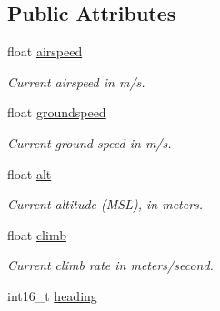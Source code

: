 \subsection*{Public Attributes}
\begin{DoxyCompactItemize}
\item 
\hypertarget{struct____mavlink__vfr__hud__t_a78714d39e0dd6db7448c6633442a9e00}{float \hyperlink{struct____mavlink__vfr__hud__t_a78714d39e0dd6db7448c6633442a9e00}{airspeed}}\label{struct____mavlink__vfr__hud__t_a78714d39e0dd6db7448c6633442a9e00}

\begin{DoxyCompactList}\small\item\em Current airspeed in m/s. \end{DoxyCompactList}\item 
\hypertarget{struct____mavlink__vfr__hud__t_aecadd708f2c0aee3193f00bd22711730}{float \hyperlink{struct____mavlink__vfr__hud__t_aecadd708f2c0aee3193f00bd22711730}{groundspeed}}\label{struct____mavlink__vfr__hud__t_aecadd708f2c0aee3193f00bd22711730}

\begin{DoxyCompactList}\small\item\em Current ground speed in m/s. \end{DoxyCompactList}\item 
\hypertarget{struct____mavlink__vfr__hud__t_a7a6c968281e1518a001e32e24424a8da}{float \hyperlink{struct____mavlink__vfr__hud__t_a7a6c968281e1518a001e32e24424a8da}{alt}}\label{struct____mavlink__vfr__hud__t_a7a6c968281e1518a001e32e24424a8da}

\begin{DoxyCompactList}\small\item\em Current altitude (M\+S\+L), in meters. \end{DoxyCompactList}\item 
\hypertarget{struct____mavlink__vfr__hud__t_a3b87f500e3394aef4c26d05435f1e7ba}{float \hyperlink{struct____mavlink__vfr__hud__t_a3b87f500e3394aef4c26d05435f1e7ba}{climb}}\label{struct____mavlink__vfr__hud__t_a3b87f500e3394aef4c26d05435f1e7ba}

\begin{DoxyCompactList}\small\item\em Current climb rate in meters/second. \end{DoxyCompactList}\item 
\hypertarget{struct____mavlink__vfr__hud__t_a54e333ab2f24a5340e8bd5cbfa91db15}{int16\+\_\+t \hyperlink{struct____mavlink__vfr__hud__t_a54e333ab2f24a5340e8bd5cbfa91db15}{heading}}\label{struct____mavlink__vfr__hud__t_a54e333ab2f24a5340e8bd5cbfa91db15}


\end{DoxyCompactItemize}
